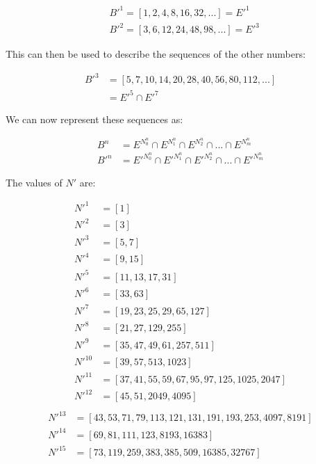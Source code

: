 \documentclass{article}
\begin{document}
\begin{displaymath}\begin{aligned}
& B'^1 = [1, 2,  4,  8, 16, 32, ...] = E'^1 \\
& B'^2 = [3, 6, 12, 24, 48, 98, ...] = E'^3
\end{aligned}\end{displaymath}

\noindent
This can then be used to describe the sequences of the other numbers:

\begin{displaymath}\begin{aligned}
B'^3
& = [5, 7, 10, 14, 20, 28, 40, 56, 80, 112, ...] \\
& = E'^5 \cap E'^7
\end{aligned}\end{displaymath}

\noindent
We can now represent these sequences as:

\begin{displaymath}\begin{aligned}
B^n  & = E^{N^n_0}  \cap E^{N^n_1}  \cap E^{N^n_2}  \cap ... \cap E^{N^n_m} \\
B'^n & = E'^{N^n_0} \cap E'^{N^n_1} \cap E'^{N^n_2} \cap ... \cap E'^{N^n_m}
\end{aligned}\end{displaymath}

\noindent
The values of \begin{math}N'\end{math} are:

\begin{displaymath}\begin{aligned}
N'^{1}  & = [1] \\
N'^{2}  & = [3] \\
N'^{3}  & = [5, 7] \\
N'^{4}  & = [9, 15] \\
N'^{5}  & = [11, 13, 17, 31] \\
N'^{6}  & = [33, 63] \\
N'^{7}  & = [19, 23, 25, 29, 65, 127] \\
N'^{8}  & = [21, 27, 129, 255] \\
N'^{9}  & = [35, 47, 49, 61, 257, 511] \\
N'^{10} & = [39, 57, 513, 1023] \\
N'^{11} & = [37, 41, 55, 59, 67, 95, 97, 125, 1025, 2047] \\
N'^{12} & = [45, 51, 2049, 4095] \\
\end{aligned}\end{displaymath}
\begin{displaymath}\begin{aligned}
N'^{13} & = [43, 53, 71, 79, 113, 121, 131, 191, 193, 253, 4097, 8191] \\
N'^{14} & = [69, 81, 111, 123, 8193, 16383] \\
N'^{15} & = [73, 119, 259, 383, 385, 509, 16385, 32767] \\
\end{aligned}\end{displaymath}
\end{document}
